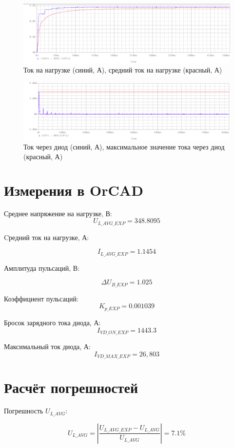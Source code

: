\begin{figure}[h!]
	\centering
	\caption{Ток на нагрузке (синий, А), средний ток на нагрузке (красный, А)}
	\includegraphics{images/model2.png}
\end{figure}

\begin{figure}[h!]
	\centering
	\caption{Ток через диод (синий, А), максимальное значение тока через диод (красный, А)}
	\includegraphics{images/model3.png}
\end{figure}

\section{Измерения в OrCAD}

Среднее напряжение на нагрузке, В:
\[
U_{L\_AVG\_EXP} = 348.8095 
\]

Cредний ток на нагрузке, А:

\[
I_{L\_AVG\_EXP}= 1.1454
\]

Амплитуда пульсаций, В:   

\[
\Delta U_{B\_EXP}=1.025
\]

Коэффициент пульсаций:
\[
K_{p\_EXP}=0.001039
\]

Бросок зарядного тока диода, А: 
\[
I_{VD\_ON\_EXP}= 1443.3
\]

Максимальный ток диода, А: 
\[
I_{VD\_MAX\_EXP} = 26,803 
\] 

\section{Расчёт погрешностей}

Погрешность $U_{L\_AVG}$:

\[
U_{L\_AVG}=\left | \frac{U_{L\_AVG\_EXP}-U_{L\_AVG}}{U_{L\_AVG}} \right | = 7.1 \%
\]


